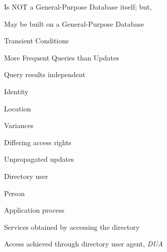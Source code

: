 \begin{bwslide}

\begin{nrtc}
\item	Is NOT a General-Purpose Database itself;  but,
\item	May be built on a General-Purpose Database
\item	Transient Conditions
\item	More Frequent Queries than Updates
\end{nrtc}
\end{bwslide}

\begin{bwslide}

\begin{nrtc}
\item	Query results independent
	\begin{nrtc}
	\item	Identity
	\item	Location
	\end{nrtc}
\item	Variances
	\begin{nrtc}
	\item	Differing access rights
	\item	Unpropagated updates
	\end{nrtc}
\end{nrtc}
\end{bwslide}

\begin{bwslide}

\begin{nrtc}
\item	Directory user
	\begin{nrtc}
	\item	Person
	\item	Application process
	\end{nrtc}
\item	Services obtained by accessing the directory
\item	Access achieved through directory user agent, {\em DUA}
\end{nrtc}
\end{bwslide}


